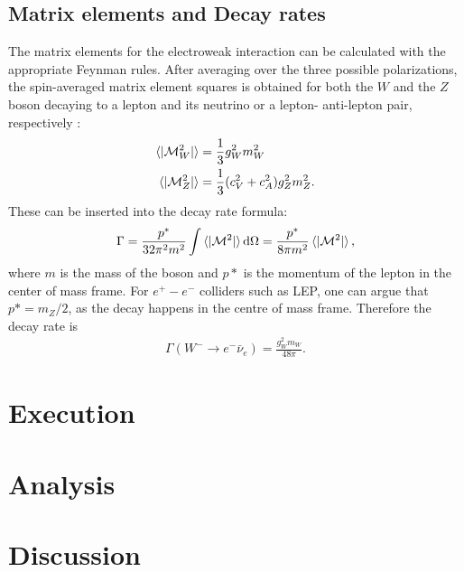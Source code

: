 \documentclass[twoside,        %
               BCOR12mm,       %
               ngerman,english, %
               fleqn,headsepline=false,footsepline=false
              ]{Vorlage/MFPREPORT}
\renewcommand{\d}{\ensuremath{\mathrm{d}}} %
\begin{document}
\subsection{Matrix elements and Decay rates}
The matrix elements for the electroweak interaction can be calculated with the
appropriate Feynman rules.
After averaging over the three possible polarizations, the spin-averaged matrix
element squares is obtained for both the $W$ and the $Z$ boson decaying to a
lepton and its neutrino or a lepton- anti-lepton pair, respectively
\cite[p.;242,411]{thomson}:
\begin{align}
    \label{eq:spinavg}
    \braket{|\mathcal{M}_W^2|}&=\frac{1}{3}g_W^2m_W^2\\
    \braket{|\mathcal{M}_Z^2|}&=\frac{1}{3}(c_V^2+c_A^2)g_Z^2m_Z^2.
\end{align}
These can be inserted into the decay rate formula: \cite[p.]{thomson}
\begin{align}
    \label{eq:decayrate}
    \Gamma=\frac{p^*}{32\pi^2m^2}\int
    \braket{|\mathcal{M}^2|}\d\Omega=\frac{p^*}{8\pi m^2}
    \braket{|\mathcal{M}^2|},
\end{align}
where $m$ is the mass of the boson and $p*$ is the momentum of the lepton in
the center of mass frame.
For $e^+-e^-$ colliders such as LEP, one can argue that $p*=m_Z/2$, as the
decay happens in the centre of mass frame.
Therefore the decay rate is 
\begin{align}
    \label{eq:decay}
    \Gamma(W^-\rightarrow e^- \bar{\nu}_e)=\frac{g_W^2m_W}{48\pi}.
\end{align}

\section{Execution}
\label{sec:execution}
\section{Analysis}
\label{sec:analysis}
\section{Discussion}


\end{document}

